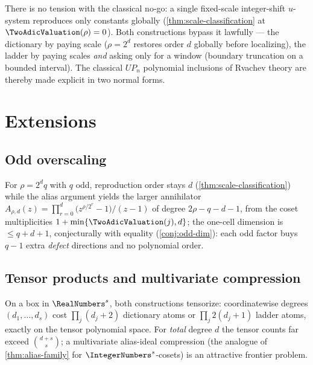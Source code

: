 \documentclass[11pt,oneside]{article}
\numberwithin{equation}{section}
\theoremstyle{definition}
\theoremstyle{remark}
\begin{document}
\begin{remark}
There is no tension with the classical no-go: a single fixed-scale
integer-shift $u$-system reproduces only constants globally
(\cref{thm:scale-classification} at $\TwoAdicValuation(\rho)=0$).  Both
constructions bypass it lawfully --- the dictionary by paying scale
($\rho=2^{d}$ restores order $d$ globally before localizing), the
ladder by paying scales \emph{and} asking only for a window (boundary
truncation on a bounded interval).  The classical $UP_n$ polynomial
inclusions of Rvachev theory \cite{RvachevRvachev1972,Rvachev1990}
are thereby made explicit in two normal forms.
\end{remark}





\section{Extensions}
\label{sec:extensions}

\subsection{Odd overscaling}
For $\rho=2^{d}q$ with $q$ odd, reproduction order stays $d$
(\cref{thm:scale-classification}) while the alias argument yields the
larger annihilator
$A_{\rho,d}(z)=\prod_{r=0}^{d}\bigl(z^{\rho/2^{r}}-1\bigr)/(z-1)$ of
degree $2\rho-q-d-1$, from the coset multiplicities
$1+\min\{\TwoAdicValuation(j),d\}$; the one-cell dimension is
$\le q+d+1$, conjecturally with equality
(\cref{conj:odd-dim}): each odd factor buys $q-1$ extra
\emph{defect} directions and no polynomial order.

\subsection{Tensor products and multivariate compression}
On a box in $\RealNumbers^{s}$, both constructions tensorize: coordinatewise
degrees $(d_1,\dots,d_s)$ cost $\prod_j(d_j+2)$ dictionary atoms or
$\prod_j2(d_j+1)$ ladder atoms, exactly on the tensor polynomial
space.  For \emph{total} degree $d$ the tensor counts far exceed
$\binom{d+s}s$; a multivariate alias-ideal compression (the analogue
of \cref{thm:alias-family} for $\IntegerNumbers^{s}$-cosets) is an attractive
frontier problem.
\end{document}
